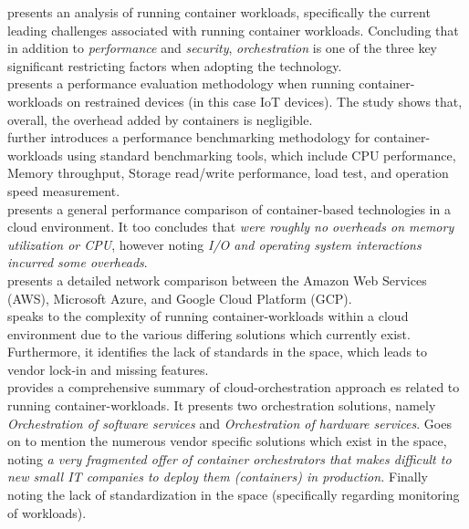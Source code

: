 \noindent \cite{https://doi.org/10.1002/cpe.5668} presents an analysis of running container workloads, specifically the current leading challenges associated with running container workloads.
Concluding that in addition to \emph{performance} and \emph{security}, \emph{orchestration} is one of the three key significant restricting factors when adopting the technology. \\

\noindent \cite{7562228} presents a performance evaluation methodology when running container-workloads on restrained devices 
(in this case IoT devices).
The study shows that, overall, the overhead added by containers is negligible. \\

\noindent \cite{POTDAR20201419} further introduces a performance benchmarking methodology for container-workloads using standard benchmarking tools, 
which include CPU performance, Memory throughput, Storage read/write performance, load test, and operation speed measurement. \\

\noindent \cite{KOZHIRBAYEV2017175} presents a general performance comparison of container-based technologies in a cloud environment. 
It too concludes that \emph{were roughly no overheads on memory utilization or CPU}, however noting \emph{I/O and operating system interactions incurred some overheads}.  \\

\noindent \cite{8500285} presents a detailed network comparison between the Amazon Web Services (AWS), Microsoft Azure, and Google Cloud Platform (GCP). \\

\noindent \cite{quint2016overcome} speaks to the complexity of running container-workloads within a cloud environment due to the various differing solutions which currently exist.
Furthermore, it identifies the lack of standards in the space, which leads to vendor lock-in and missing features. \\

\noindent \cite{7185168} provides a comprehensive summary of cloud-orchestration approach  es related to running container-workloads. It presents two orchestration solutions, namely 
\emph{Orchestration of software services} and \emph{Orchestration of hardware services}. 
Goes on to mention the numerous vendor specific solutions which exist in the space, noting 
\emph{a very fragmented offer of container orchestrators that makes difficult to new small IT companies to deploy them (containers) in production.}
Finally noting the lack of standardization in the space (specifically regarding monitoring of workloads).